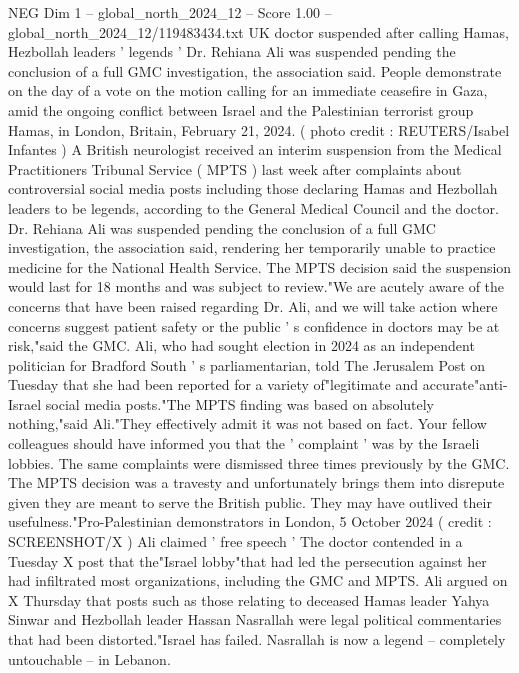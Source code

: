 \begin{textsample}{NEG Dim 1 – global\_north\_2024\_12 – Score 1.00 – global\_north\_2024\_12/119483434.txt}  \label{ex:f1_neg_192}
UK doctor suspended after calling Hamas, Hezbollah leaders ' legends ' Dr.
Rehiana Ali was suspended pending the conclusion of a full GMC investigation, the association said.
People demonstrate on the day of a vote on the motion calling for an immediate ceasefire in Gaza, amid the ongoing conflict between Israel and the Palestinian terrorist group Hamas, in London, Britain, February 21, 2024. ( photo credit : REUTERS/Isabel Infantes ) A British neurologist received an interim suspension from the Medical Practitioners Tribunal Service ( MPTS ) last week after complaints about controversial social media posts including those declaring Hamas and Hezbollah leaders to be legends, according to the General Medical Council and the doctor.
Dr.
Rehiana Ali was suspended pending the conclusion of a full GMC investigation, the association said, rendering her temporarily unable to practice medicine for the National Health Service.
The MPTS decision said the suspension would last for 18 months and was subject to review."We are acutely aware of the concerns that have been raised regarding Dr.
Ali, and we will take action where concerns suggest patient safety or the public ' s confidence in doctors may be at risk,"said the GMC.
Ali, who had sought election in 2024 as an independent politician for Bradford South ' s parliamentarian, told The Jerusalem Post on Tuesday that she had been reported for a variety of"legitimate and accurate"anti-Israel social media posts."The MPTS finding was based on absolutely nothing,"said Ali."They effectively admit it was not based on fact.
Your fellow colleagues should have informed you that the ' complaint ' was by the Israeli lobbies.
The same complaints were dismissed three times previously by the GMC.
The MPTS decision was a travesty and unfortunately brings them into disrepute given they are meant to serve the British public.
They may have outlived their usefulness."Pro-Palestinian demonstrators in London, 5 October 2024 ( credit : SCREENSHOT/X ) Ali claimed ' free speech ' The doctor contended in a Tuesday X post that the"Israel lobby"that had led the persecution against her had infiltrated most organizations, including the GMC and MPTS.
Ali argued on X Thursday that posts such as those relating to deceased Hamas leader Yahya Sinwar and Hezbollah leader Hassan Nasrallah were legal political commentaries that had been distorted."Israel has failed.
Nasrallah is now a legend -- completely untouchable -- in Lebanon.

\end{textsample}
